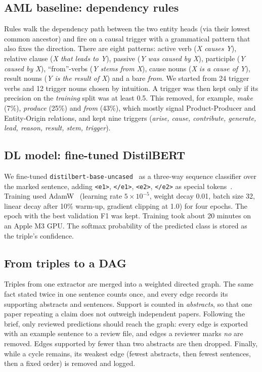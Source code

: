 \documentclass[11pt,a4paper]{article}
\begin{document}
\subsection{AML baseline: dependency rules}

Rules walk the dependency path between the two entity heads (via their lowest common ancestor) and fire on a causal trigger with a
grammatical pattern that also fixes the direction. There are eight patterns: active verb (\textit{X causes Y}), relative clause
(\textit{X that leads to Y}), passive (\textit{Y was caused by X}), participle (\textit{Y caused by X}), ``from''-verbs
(\textit{Y stems from X}), cause nouns (\textit{X is a cause of Y}), result nouns (\textit{Y is the result of X}) and a bare
\textit{from}. We started from 24 trigger verbs and 12 trigger nouns chosen by intuition. A trigger was then kept only if its precision
on the \emph{training} split was at least 0.5. This removed, for example, \textit{make} (7\%), \textit{produce} (25\%) and
\textit{from} (43\%), which mostly signal Product-Producer and Entity-Origin relations, and kept nine triggers (\textit{arise, cause,
contribute, generate, lead, reason, result, stem, trigger}).

\subsection{DL model: fine-tuned DistilBERT}\label{sec:dl}

We fine-tuned \texttt{distilbert-base-uncased}~\citep{sanh2019,wolf2020} as a three-way sequence classifier over the marked sentence,
adding \texttt{<e1>}, \texttt{</e1>}, \texttt{<e2>}, \texttt{</e2>} as special tokens~\citep{baldinisoares2019}. Training used
AdamW~\citep{loshchilov2019} (learning rate $5\times10^{-5}$, weight decay 0.01, batch size 32, linear decay after 10\% warm-up,
gradient clipping at 1.0) for four epochs. The epoch with the best validation F1 was kept. Training took about 20 minutes on an Apple M3 GPU.
The softmax probability of the predicted class is stored as the triple's confidence.

\subsection{From triples to a DAG}

Triples from one extractor are merged into a weighted directed graph. The same fact stated twice in one sentence counts once, and
every edge records its supporting abstracts and sentences. Support is counted in \emph{abstracts}, so that one paper repeating a claim
does not outweigh independent papers. Following the brief, only reviewed predictions should reach the graph: every edge is exported
with an example sentence to a review file, and edges a reviewer marks \textit{no} are removed. Edges supported by fewer than two
abstracts are then dropped. Finally, while a cycle remains, its weakest edge (fewest abstracts, then fewest sentences, then a fixed
order) is removed and logged.
\end{document}
